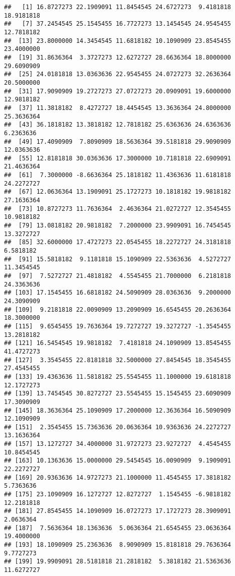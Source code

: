\documentclass[]{book}
\begin{document}
\begin{verbatim}
##   [1] 16.8727273 22.1909091 11.8454545 24.6727273  9.4181818 18.9181818
##   [7] 37.2454545 25.1545455 16.7727273 13.1454545 24.9545455 12.7818182
##  [13] 23.8000000 14.3454545 11.6818182 10.1090909 23.8545455 23.4000000
##  [19] 31.8636364  3.3727273 12.6272727 28.6636364 18.8000000 29.6090909
##  [25] 24.0181818 13.0363636 22.9545455 24.0727273 32.2636364 20.5000000
##  [31] 17.9090909 19.2727273 27.0727273 20.0909091 19.6000000 12.9818182
##  [37] 11.3818182  8.4272727 18.4454545 13.3636364 24.8000000 25.3636364
##  [43] 36.1818182 13.3818182 12.7818182 25.6363636 24.6363636  6.2363636
##  [49] 17.4090909  7.8090909 18.5636364 39.5181818 29.9090909 12.0363636
##  [55] 12.8181818 30.0363636 17.3000000 10.7181818 22.6909091 21.4636364
##  [61]  7.3000000 -8.6636364 25.1818182 11.4363636 11.6181818 24.2272727
##  [67] 12.0636364 13.1909091 25.1727273 10.1818182 19.9818182 27.1636364
##  [73] 10.8727273 11.7636364  2.4636364 21.0272727 12.3545455 10.9818182
##  [79] 13.0818182 20.9818182  7.2000000 23.9909091 16.7454545 13.3272727
##  [85] 32.6000000 17.4727273 22.0545455 18.2272727 24.3181818  6.5818182
##  [91] 15.5818182  9.1181818 15.1090909 22.5363636  4.5272727 11.3454545
##  [97]  7.5272727 21.4818182  4.5545455 21.7000000  6.2181818 24.3363636
## [103] 17.1545455 16.6818182 24.5090909 28.0363636  9.2000000 24.3090909
## [109]  9.2181818 22.0090909 13.2090909 16.6545455 20.2636364 18.3000000
## [115]  9.6545455 19.7636364 19.7272727 19.3272727 -1.3545455 13.2818182
## [121] 16.5454545 19.9818182  7.4181818 24.1090909 13.8545455 41.4727273
## [127]  3.3545455 22.8181818 32.5000000 27.8454545 18.3545455 27.4545455
## [133] 19.4363636 11.5818182 25.5545455 11.1000000 19.6181818 12.1727273
## [139] 13.7454545 30.8272727 23.5545455 15.1545455 23.6090909 17.3090909
## [145] 18.3636364 25.1090909 17.2000000 12.3636364 16.5090909 12.1090909
## [151]  2.3545455 15.7363636 20.0636364 10.9363636 24.2272727 13.1636364
## [157] 13.1272727 34.4000000 31.9727273 23.9272727  4.4545455 10.8454545
## [163] 10.1363636 15.0000000 29.5454545 16.0090909  9.1909091 22.2272727
## [169] 20.9363636 14.9727273 21.1000000 11.4545455 17.3818182  5.7363636
## [175] 23.1090909 16.1272727 12.8272727  1.1545455 -6.9818182 12.2181818
## [181] 27.8545455 14.1090909 16.0727273 17.1727273 28.3909091  2.0636364
## [187]  7.5636364 18.1363636  5.0636364 21.6545455 23.0636364 19.4000000
## [193] 18.1090909 25.2363636  8.9090909 15.8181818 29.7636364  9.7727273
## [199] 19.9909091 28.5181818 21.2818182  5.3818182 21.5363636 11.6272727

\end{verbatim}
\end{document}
